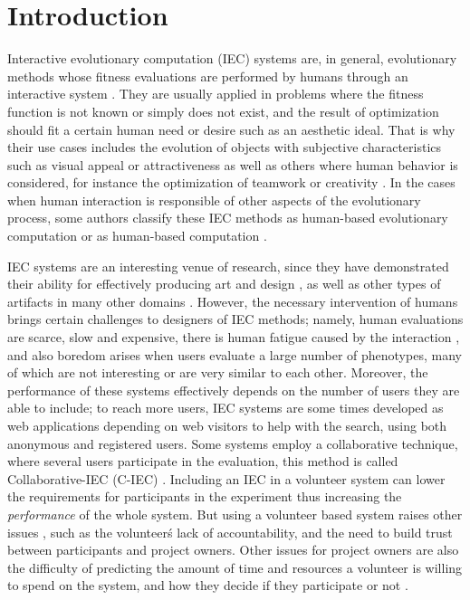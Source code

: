 \section{Introduction}




Interactive evolutionary computation (IEC) systems are, in general, evolutionary methods
whose fitness evaluations are performed by humans through an interactive 
system \cite{eiben2015interactive}.
They are usually applied in problems where the fitness function is not known or simply
does not exist, and the result of optimization should fit a certain human need or
desire such as an aesthetic ideal.  
That is why their use cases includes the evolution of objects with subjective characteristics
such as visual appeal or attractiveness \cite{biomorphs} as well as others where human behavior is 
considered, for instance the optimization of teamwork \cite{kosorukoff2002evolutionary}
or creativity \cite{yu2011cooks}. In the cases when 
human interaction is responsible of other 
aspects of the evolutionary process, some authors classify these IEC methods 
as human-based evolutionary computation \cite{972056} 
or as human-based computation \cite{quinn2011human}.

IEC systems are an interesting venue of research, since they have demonstrated 
their ability for effectively 
producing art and design \cite{Bentley:1999:intro,Sims:1991,todd:1992,evoeco},
as well as other types of artifacts in many other domains \cite{ie1}. 
However, the necessary intervention of humans brings certain challenges 
to designers of IEC methods; namely, human evaluations are scarce, slow and expensive, there is
human fatigue caused by the interaction \cite{ie1}, and also boredom arises
when users evaluate a large number of phenotypes, 
many of which are not interesting or are very similar to each other.
Moreover, the performance of these systems effectively depends on the number of users
they are able to include; to reach more users,
IEC systems are some times developed as web applications depending on web visitors to help
with the search, using both anonymous and registered users. Some systems 
employ a collaborative technique, where several users participate in 
the evaluation, this method is called Collaborative-IEC (C-IEC)
\cite{picbreeder,seyama2016development,wagy2014collective}.
Including an IEC in a volunteer system can lower the requirements for
participants in the experiment thus increasing the {\em performance} of the whole system. But using a volunteer based 
system raises other issues \cite{sarmenta2001volunteer,web:BOINC}, such as the 
volunteer\'s lack of accountability, and the need to build trust between participants and project
owners. Other issues for project owners are also the difficulty of predicting 
the amount of time and resources a volunteer is willing to spend on the system, 
and how they decide if they participate or not \cite{JJ:2016}. 

